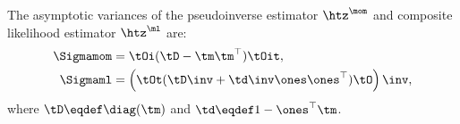 %
%
\begin{lemma*}
  The asymptotic variances of the pseudoinverse estimator $\htz^\mom$
  and composite likelihood estimator $\htz^\ml$ are:
  \begin{align*}
    \Sigmamom 
      &= \tOi (\tD - \tm \tm^\top) \tOit, \\
    \Sigmaml 
      &=
      \left( \tOt (\tD\inv + \td\inv \ones\ones^\top) \tO \right)\inv,
  \end{align*}
  where $\tD \eqdef \diag(\tm)$ and $\td \eqdef 1 - \ones^\top\tm$.
\end{lemma*}

